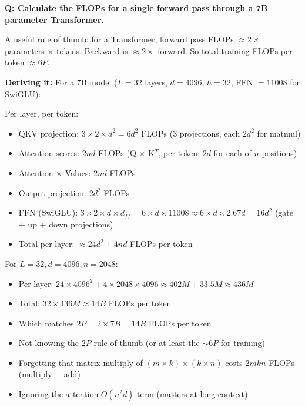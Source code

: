 \begin{interviewq}
\textbf{Q: Calculate the FLOPs for a single forward pass through a 7B parameter Transformer.}

 \quad {} \quad \badgefreq{\freqhigh}

\stronganswer A useful rule of thumb: for a Transformer, forward pass FLOPs $\approx 2 \times$ parameters $\times$ tokens. Backward is $\approx 2\times$ forward. So total training FLOPs per token $\approx 6P$.

\textbf{Deriving it:} For a 7B model ($L=32$ layers, $d=4096$, $h=32$, FFN $=11008$ for SwiGLU):

Per layer, per token:
\begin{itemize}
    \item QKV projection: $3 \times 2 \times d^2 = 6d^2$ FLOPs (3 projections, each $2d^2$ for matmul)
    \item Attention scores: $2nd$ FLOPs (Q $\times$ K$^T$, per token: $2d$ for each of $n$ positions)
    \item Attention $\times$ Values: $2nd$ FLOPs
    \item Output projection: $2d^2$ FLOPs
    \item FFN (SwiGLU): $3 \times 2 \times d \times d_{ff} = 6 \times d \times 11008 \approx 6 \times d \times 2.67d = 16d^2$ (gate + up + down projections)
    \item Total per layer: $\approx 24d^2 + 4nd$ FLOPs per token
\end{itemize}

For $L=32, d=4096, n=2048$:
\begin{itemize}
    \item Per layer: $24 \times 4096^2 + 4 \times 2048 \times 4096 \approx 402M + 33.5M \approx 436M$
    \item Total: $32 \times 436M \approx 14B$ FLOPs per token
    \item Which matches $2P = 2 \times 7B = 14B$ FLOPs per token
\end{itemize}

\redflags
\begin{itemize}
    \item Not knowing the $2P$ rule of thumb (or at least the $\sim 6P$ for training)
    \item Forgetting that matrix multiply of $(m \times k) \times (k \times n)$ costs $2mkn$ FLOPs (multiply + add)
    \item Ignoring the attention $O(n^2 d)$ term (matters at long context)
\end{itemize}


\end{interviewq}
